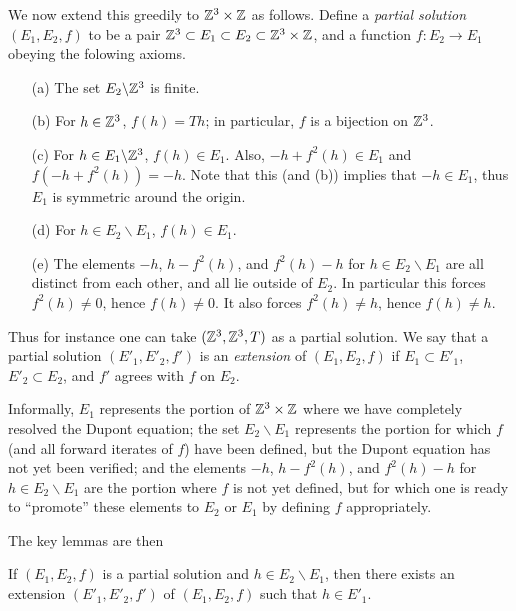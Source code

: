 We now extend this greedily to $\mathbb{Z}^3 \times \mathbb{Z}$ as follows.  Define a \emph{partial solution} $(E_1,E_2,f)$ to be a pair $\mathbb{Z}^3 \subset E_1 \subset E_2 \subset \mathbb{Z}^3 \times \mathbb{Z}$, and a function $f: E_2 \to E_1$ obeying the folowing axioms.
\begin{itemize}
  \item[(a)] The set $E_2 \backslash \mathbb{Z}^3$ is finite.
  \item[(b)] For $h \in \mathbb{Z}^3$, $f(h) = Th$; in particular, $f$ is a bijection on $\mathbb{Z}^3$.
  \item[(c)] For $h \in E_1 \backslash \mathbb{Z}^3$, $f(h) \in E_1$.  Also, $-h + f^2(h) \in E_1$ and $f(-h + f^2(h)) = -h$. Note that this (and (b)) implies that $-h \in E_1$, thus $E_1$ is symmetric around the origin.
  \item[(d)] For $h \in E_2 \backslash E_1$, $f(h) \in E_1$.
  \item[(e)] The elements $-h$, $h - f^2(h)$, and $f^2(h) - h$ for $h \in E_2 \backslash E_1$ are all distinct from each other, and all lie outside of $E_2$.  In particular this forces $f^2(h) \neq 0$, hence $f(h) \neq 0$. It also forces $f^2(h) \neq h$, hence $f(h) \neq h$.
\end{itemize}
Thus for instance one can take $(\mathbb{Z}^3,\mathbb{Z}^3,T)$ as a partial solution.  We say that a partial solution $(E'_1, E'_2, f')$ is an \emph{extension} of $(E_1,E_2,f)$ if $E_1 \subset E'_1$, $E'_2 \subset E_2$, and $f'$ agrees with $f$ on $E_2$.

Informally, $E_1$ represents the portion of $\mathbb{Z}^3 \times \mathbb{Z}$ where we have completely resolved the Dupont equation; the set $E_2 \backslash E_1$ represents the portion for which $f$ (and all forward iterates of $f$) have been defined, but the Dupont equation has not yet been verified; and the elements $-h$, $h - f^2(h)$, and $f^2(h) - h$ for $h \in E_2 \backslash E_1$ are the portion where $f$ is not yet defined, but for which one is ready to ``promote'' these elements to $E_2$ or $E_1$ by defining $f$ appropriately.

The key lemmas are then

\begin{lemma}[Promoting to $E_1$]\label{add-E1}  If $(E_1,E_2,f)$ is a partial solution and $h \in E_2 \backslash E_1$, then there exists an extension $(E'_1,E'_2,f')$ of $(E_1,E_2,f)$ such that $h \in E'_1$.
\end{lemma}

